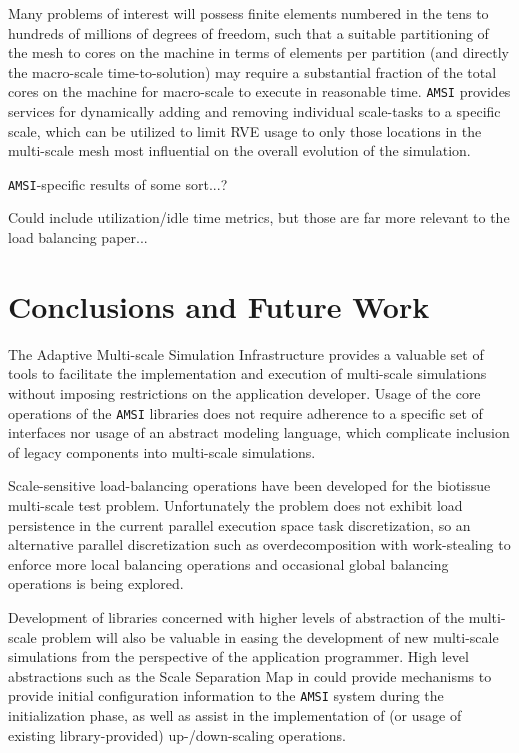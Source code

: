 \documentclass[11pt]{article}
\begin{document}
Many problems of interest will possess finite elements numbered in the tens to hundreds of millions of degrees of freedom, such that a suitable partitioning of the mesh to cores on the machine in terms of elements per partition (and directly the macro-scale time-to-solution) may require a substantial fraction of the total cores on the machine for macro-scale to execute in reasonable time. \verb|AMSI| provides services for dynamically adding and removing individual scale-tasks to a specific scale, which can be utilized to limit RVE usage to only those locations in the multi-scale mesh most influential on the overall evolution of the simulation.

\verb|AMSI|-specific results of some sort...?

Could include utilization/idle time metrics, but those are far more relevant to the load balancing paper...

\section{Conclusions and Future Work}\label{future_work}

The Adaptive Multi-scale Simulation Infrastructure provides a valuable set of tools to facilitate the implementation and execution of multi-scale simulations without imposing restrictions on the application developer. Usage of the core operations of the \verb|AMSI| libraries does not require adherence to a specific set of interfaces nor usage of an abstract modeling language, which complicate inclusion of legacy components into multi-scale simulations.

Scale-sensitive load-balancing operations have been developed for the biotissue multi-scale test problem. Unfortunately the problem does not exhibit load persistence in the current parallel execution space task discretization, so an alternative parallel discretization such as overdecomposition with work-stealing to enforce more local balancing operations and occasional global balancing operations is being explored.

Development of libraries concerned with higher levels of abstraction of the multi-scale problem will also be valuable in easing the development of new multi-scale simulations from the perspective of the application programmer. High level abstractions such as the Scale Separation Map in \cite{chopard2011framework} could provide mechanisms to provide initial configuration information to the \verb|AMSI| system during the initialization phase, as well as assist in the implementation of (or usage of existing library-provided) up-/down-scaling operations.
\end{document}

